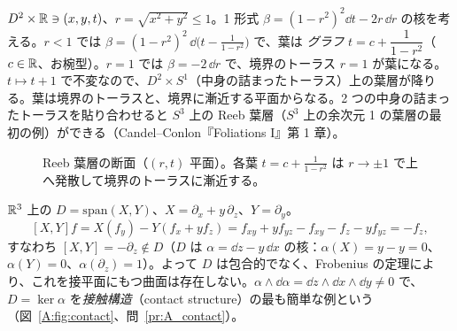 \begin{ex}[Reeb 葉層（軽く）]
$D^2\times\mathbb R\ni(x,y,t)$、$r=\sqrt{x^2+y^2}\le1$。1 形式 $\beta=(1-r^2)^2\dd t-2r\,\dd r$ の核を考える。$r<1$ では $\beta=(1-r^2)^2\,\dd\bigl(t-\frac1{1-r^2}\bigr)$ で、葉は \emph{グラフ} $t=c+\dfrac1{1-r^2}$（$c\in\mathbb R$、お椀型）。$r=1$ では $\beta=-2\,\dd r$ で、境界のトーラス $r=1$ が葉になる。$t\mapsto t+1$ で不変なので、$D^2\times S^1$（中身の詰まったトーラス）上の葉層が降りる。葉は境界のトーラスと、境界に漸近する平面からなる。2 つの中身の詰まったトーラスを貼り合わせると $S^3$ 上の Reeb 葉層（$S^3$ 上の余次元 1 の葉層の最初の例）ができる\tC（Candel--Conlon『Foliations I』第 1 章\tQ）。
\end{ex}

\begin{figure}[htbp]
\centering
{}
\caption{Reeb 葉層の断面（$(r,t)$ 平面）。各葉 $t=c+\frac1{1-r^2}$ は $r\to\pm1$ で上へ発散して境界のトーラスに漸近する。}
\end{figure}

\begin{ex}\label{A:ex:contact}
$\mathbb R^3$ 上の $D=\mathrm{span}(X,Y)$、$X=\partial_x+y\,\partial_z$、$Y=\partial_y$。
\[
[X,Y]f=X(f_y)-Y(f_x+yf_z)=f_{xy}+yf_{yz}-f_{xy}-f_z-yf_{yz}=-f_z,
\]
すなわち $[X,Y]=-\partial_z\notin D$（$D$ は $\alpha=\dd z-y\,\dd x$ の核：$\alpha(X)=y-y=0$、$\alpha(Y)=0$、$\alpha(\partial_z)=1$）。よって $D$ は包合的でなく、Frobenius の定理により、これを接平面にもつ曲面は存在しない。$\alpha\wedge\dd\alpha=\dd z\wedge\dd x\wedge\dd y\ne0$ で、$D=\ker\alpha$ を\emph{接触構造}（contact structure）の最も簡単な例という（図~\ref{A:fig:contact}、問~\ref{pr:A_contact}）。
\end{ex}

